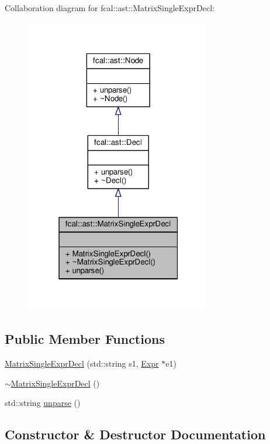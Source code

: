Collaboration diagram for fcal\+:\+:ast\+:\+:Matrix\+Single\+Expr\+Decl\+:
\nopagebreak
\begin{figure}[H]
\begin{center}
\leavevmode
\includegraphics[width=232pt]{classfcal_1_1ast_1_1MatrixSingleExprDecl__coll__graph}
\end{center}
\end{figure}
\subsection*{Public Member Functions}
\begin{DoxyCompactItemize}
\item 
\hyperlink{classfcal_1_1ast_1_1MatrixSingleExprDecl_a308affe806b1ad32550dc19b5dad86a9}{Matrix\+Single\+Expr\+Decl} (std\+::string s1, \hyperlink{classfcal_1_1ast_1_1Expr}{Expr} $\ast$e1)
\item 
\hyperlink{classfcal_1_1ast_1_1MatrixSingleExprDecl_a5ca59da590c98dc35dbe5eadf66498e4}{$\sim$\+Matrix\+Single\+Expr\+Decl} ()
\item 
std\+::string \hyperlink{classfcal_1_1ast_1_1MatrixSingleExprDecl_a3c983adc4f904b051d6f908a9c6da76e}{unparse} ()
\end{DoxyCompactItemize}


\subsection{Constructor \& Destructor Documentation}
